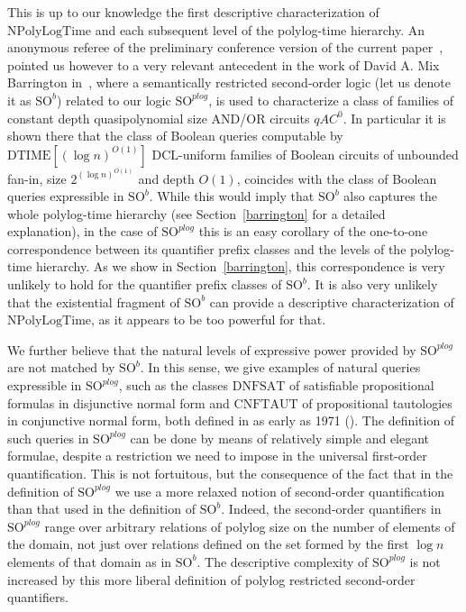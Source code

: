 \documentclass{article}
\newcommand{\npolylog}{\mathrm{NPolyLogTime}}
\begin{document}
This is up to our knowledge the first descriptive characterization of $\npolylog$ and each subsequent level of the polylog-time hierarchy. An anonymous referee of the preliminary conference version of the current paper~\cite{FerrarottiGST08}, pointed us however to a very relevant antecedent in the work of David A. Mix Barrington in~\cite{Barr92}, where a semantically restricted second-order logic (let us denote it as $\mathrm{SO}^b$) related to our logic $\mathrm{SO}^{\mathit{plog}}$, is used to characterize a class of families of constant depth quasipolynomial size AND/OR circuits $\mathit{qAC}^0$. In particular it is shown there that the class of Boolean queries computable by $\mathrm{DTIME}[(\log n)^{{O}(1)}]$ $\mathrm{DCL}$-uniform families of Boolean circuits of unbounded fan-in, size $2^{({\log n})^{{O}(1)}}$ and depth ${O}(1)$, coincides with the class of Boolean queries expressible in $\mathrm{SO}^{b}$. While this would imply that $\mathrm{SO}^{b}$ also captures the whole polylog-time hierarchy (see Section~\ref{barrington} for a detailed explanation), in the case of $\mathrm{SO}^{\mathit{plog}}$ this is an easy corollary of the one-to-one correspondence between its quantifier prefix classes and the levels of the polylog-time hierarchy. As we show in Section~\ref{barrington},  this correspondence is very unlikely to hold for the quantifier prefix classes of $\mathrm{SO}^b$. It is also very unlikely that the existential fragment of $\mathrm{SO}^b$ can provide a descriptive characterization of $\npolylog$, as it appears to be too powerful for that. 


We further believe that the natural levels of expressive power provided by $\mathrm{SO}^{\mathit{plog}}$ are not matched by $\mathrm{SO}^b$. In this sense, we give examples of natural queries expressible in $\mathrm{SO}^{\mathit{plog}}$, such as the classes $\mathrm{DNFSAT}$ of satisfiable propositional formulas in disjunctive normal form and $\mathrm{CNFTAUT}$ of propositional tautologies in conjunctive normal form, both defined in as early as 1971 (\cite{Cook_71}). The definition of such queries in $\mathrm{SO}^{\mathit{plog}}$ can be done by means of relatively simple and elegant formulae, despite a restriction we need to impose in the universal first-order quantification. This is not fortuitous, but the consequence of the fact that in the definition of $\mathrm{SO}^{\mathit{plog}}$ we use a more relaxed notion of second-order quantification than that used in the definition of $\mathrm{SO}^b$. Indeed, the second-order quantifiers in $\mathrm{SO}^{\mathit{plog}}$ range over arbitrary relations of polylog size on the number of elements of the domain, not just over relations defined on the set formed by the first $\log n$ elements of that domain as in $\mathrm{SO}^b$. The descriptive complexity of $\mathrm{SO}^{\mathit{plog}}$ is not increased by this more liberal definition of polylog restricted second-order quantifiers.
\end{document}
